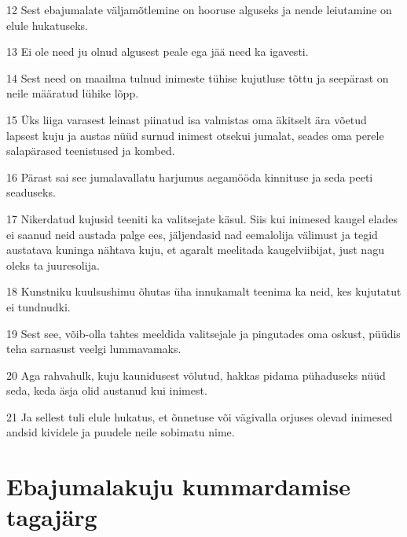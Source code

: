 \par 12 Sest ebajumalate väljamõtlemine on hooruse alguseks ja nende leiutamine on elule hukatuseks.
\par 13 Ei ole need ju olnud algusest peale ega jää need ka igavesti.
\par 14 Sest need on maailma tulnud inimeste tühise kujutluse tõttu ja seepärast on neile määratud lühike lõpp.
\par 15 Üks liiga varasest leinast piinatud isa valmistas oma äkitselt ära võetud lapsest kuju ja austas nüüd surnud inimest otsekui jumalat, seades oma perele salapärased teenistused ja kombed.
\par 16 Pärast sai see jumalavallatu harjumus aegamööda kinnituse ja seda peeti seaduseks.
\par 17 Nikerdatud kujusid teeniti ka valitsejate käsul. Siis kui inimesed kaugel elades ei saanud neid austada palge ees, jäljendasid nad eemalolija välimust ja tegid austatava kuninga nähtava kuju, et agaralt meelitada kaugelviibijat, just nagu oleks ta juuresolija.
\par 18 Kunstniku kuulsushimu õhutas üha innukamalt teenima ka neid, kes kujutatut ei tundnudki.
\par 19 Sest see, võib-olla tahtes meeldida valitsejale ja pingutades oma oskust, püüdis teha sarnasust veelgi lummavamaks.
\par 20 Aga rahvahulk, kuju kaunidusest võlutud, hakkas pidama pühaduseks nüüd seda, keda äsja olid austanud kui inimest.
\par 21 Ja sellest tuli elule hukatus, et õnnetuse või vägivalla orjuses olevad inimesed andsid kividele ja puudele neile sobimatu nime. 

\section*{Ebajumalakuju kummardamise tagajärg}

